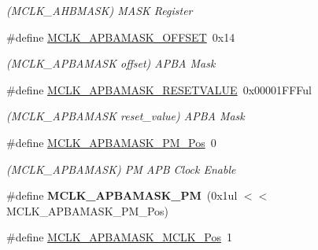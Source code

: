 \begin{DoxyCompactItemize}
\begin{DoxyCompactList}\small\item\em (M\+C\+L\+K\+\_\+\+A\+H\+B\+M\+A\+S\+K) M\+A\+S\+K Register \end{DoxyCompactList}\item 
\hypertarget{group___s_a_m_l21___m_c_l_k_ga0c6c90fc226352932e5d81fb51efebc0}{}\#define \hyperlink{group___s_a_m_l21___m_c_l_k_ga0c6c90fc226352932e5d81fb51efebc0}{M\+C\+L\+K\+\_\+\+A\+P\+B\+A\+M\+A\+S\+K\+\_\+\+O\+F\+F\+S\+E\+T}~0x14\label{group___s_a_m_l21___m_c_l_k_ga0c6c90fc226352932e5d81fb51efebc0}

\begin{DoxyCompactList}\small\item\em (M\+C\+L\+K\+\_\+\+A\+P\+B\+A\+M\+A\+S\+K offset) A\+P\+B\+A Mask \end{DoxyCompactList}\item 
\hypertarget{group___s_a_m_l21___m_c_l_k_ga3d96d2b490df3f3164791e72baeabe60}{}\#define \hyperlink{group___s_a_m_l21___m_c_l_k_ga3d96d2b490df3f3164791e72baeabe60}{M\+C\+L\+K\+\_\+\+A\+P\+B\+A\+M\+A\+S\+K\+\_\+\+R\+E\+S\+E\+T\+V\+A\+L\+U\+E}~0x00001\+F\+F\+Ful\label{group___s_a_m_l21___m_c_l_k_ga3d96d2b490df3f3164791e72baeabe60}

\begin{DoxyCompactList}\small\item\em (M\+C\+L\+K\+\_\+\+A\+P\+B\+A\+M\+A\+S\+K reset\+\_\+value) A\+P\+B\+A Mask \end{DoxyCompactList}\item 
\hypertarget{group___s_a_m_l21___m_c_l_k_ga04293b17854c4a2862117cb1e92e90d9}{}\#define \hyperlink{group___s_a_m_l21___m_c_l_k_ga04293b17854c4a2862117cb1e92e90d9}{M\+C\+L\+K\+\_\+\+A\+P\+B\+A\+M\+A\+S\+K\+\_\+\+P\+M\+\_\+\+Pos}~0\label{group___s_a_m_l21___m_c_l_k_ga04293b17854c4a2862117cb1e92e90d9}

\begin{DoxyCompactList}\small\item\em (M\+C\+L\+K\+\_\+\+A\+P\+B\+A\+M\+A\+S\+K) P\+M A\+P\+B Clock Enable \end{DoxyCompactList}\item 
\hypertarget{group___s_a_m_l21___m_c_l_k_ga7941e06780c125fd16a2d5ae4d1f8e1e}{}\#define {\bfseries M\+C\+L\+K\+\_\+\+A\+P\+B\+A\+M\+A\+S\+K\+\_\+\+P\+M}~(0x1ul $<$$<$ M\+C\+L\+K\+\_\+\+A\+P\+B\+A\+M\+A\+S\+K\+\_\+\+P\+M\+\_\+\+Pos)\label{group___s_a_m_l21___m_c_l_k_ga7941e06780c125fd16a2d5ae4d1f8e1e}

\item 
\hypertarget{group___s_a_m_l21___m_c_l_k_ga0db8d768734ebf5b9b0c4b32fff4ad02}{}\#define \hyperlink{group___s_a_m_l21___m_c_l_k_ga0db8d768734ebf5b9b0c4b32fff4ad02}{M\+C\+L\+K\+\_\+\+A\+P\+B\+A\+M\+A\+S\+K\+\_\+\+M\+C\+L\+K\+\_\+\+Pos}~1\label{group___s_a_m_l21___m_c_l_k_ga0db8d768734ebf5b9b0c4b32fff4ad02}


\end{DoxyCompactItemize}
